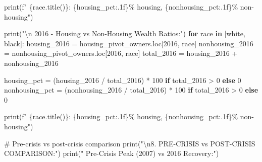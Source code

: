 \documentclass[
  letterpaper,
  DIV=11,
  numbers=noendperiod]{scrartcl}
\newenvironment{Shaded}{\begin{snugshade}}{\end{snugshade}}
\newcommand{\BuiltInTok}[1]{\textcolor[rgb]{0.00,0.23,0.31}{#1}}
\newcommand{\CharTok}[1]{\textcolor[rgb]{0.13,0.47,0.30}{#1}}
\newcommand{\CommentTok}[1]{\textcolor[rgb]{0.37,0.37,0.37}{#1}}
\newcommand{\ControlFlowTok}[1]{\textcolor[rgb]{0.00,0.23,0.31}{\textbf{#1}}}
\newcommand{\DecValTok}[1]{\textcolor[rgb]{0.68,0.00,0.00}{#1}}
\newcommand{\KeywordTok}[1]{\textcolor[rgb]{0.00,0.23,0.31}{\textbf{#1}}}
\newcommand{\NormalTok}[1]{\textcolor[rgb]{0.00,0.23,0.31}{#1}}
\newcommand{\OperatorTok}[1]{\textcolor[rgb]{0.37,0.37,0.37}{#1}}
\newcommand{\SpecialCharTok}[1]{\textcolor[rgb]{0.37,0.37,0.37}{#1}}
\newcommand{\SpecialStringTok}[1]{\textcolor[rgb]{0.13,0.47,0.30}{#1}}
\newcommand{\StringTok}[1]{\textcolor[rgb]{0.13,0.47,0.30}{#1}}
\begin{document}
\begin{Shaded}
\begin{Highlighting}[]
    \BuiltInTok{print}\NormalTok{(}\SpecialStringTok{f"     }\SpecialCharTok{\{}\NormalTok{race}\SpecialCharTok{.}\NormalTok{title()}\SpecialCharTok{\}}\SpecialStringTok{: }\SpecialCharTok{\{}\NormalTok{housing\_pct}\SpecialCharTok{:.1f\}}\SpecialStringTok{\% housing, }\SpecialCharTok{\{}\NormalTok{nonhousing\_pct}\SpecialCharTok{:.1f\}}\SpecialStringTok{\% non{-}housing"}\NormalTok{)}

\BuiltInTok{print}\NormalTok{(}\StringTok{"}\CharTok{\textbackslash{}n}\StringTok{   2016 {-} Housing vs Non{-}Housing Wealth Ratios:"}\NormalTok{)}
\ControlFlowTok{for}\NormalTok{ race }\KeywordTok{in}\NormalTok{ [}\StringTok{\textquotesingle{}white\textquotesingle{}}\NormalTok{, }\StringTok{\textquotesingle{}black\textquotesingle{}}\NormalTok{]:}
\NormalTok{    housing\_2016 }\OperatorTok{=}\NormalTok{ housing\_pivot\_owners.loc[}\DecValTok{2016}\NormalTok{, race]}
\NormalTok{    nonhousing\_2016 }\OperatorTok{=}\NormalTok{ nonhousing\_pivot\_owners.loc[}\DecValTok{2016}\NormalTok{, race]}
\NormalTok{    total\_2016 }\OperatorTok{=}\NormalTok{ housing\_2016 }\OperatorTok{+}\NormalTok{ nonhousing\_2016}
    
\NormalTok{    housing\_pct }\OperatorTok{=}\NormalTok{ (housing\_2016 }\OperatorTok{/}\NormalTok{ total\_2016) }\OperatorTok{*} \DecValTok{100} \ControlFlowTok{if}\NormalTok{ total\_2016 }\OperatorTok{\textgreater{}} \DecValTok{0} \ControlFlowTok{else} \DecValTok{0}
\NormalTok{    nonhousing\_pct }\OperatorTok{=}\NormalTok{ (nonhousing\_2016 }\OperatorTok{/}\NormalTok{ total\_2016) }\OperatorTok{*} \DecValTok{100} \ControlFlowTok{if}\NormalTok{ total\_2016 }\OperatorTok{\textgreater{}} \DecValTok{0} \ControlFlowTok{else} \DecValTok{0}
    
    \BuiltInTok{print}\NormalTok{(}\SpecialStringTok{f"     }\SpecialCharTok{\{}\NormalTok{race}\SpecialCharTok{.}\NormalTok{title()}\SpecialCharTok{\}}\SpecialStringTok{: }\SpecialCharTok{\{}\NormalTok{housing\_pct}\SpecialCharTok{:.1f\}}\SpecialStringTok{\% housing, }\SpecialCharTok{\{}\NormalTok{nonhousing\_pct}\SpecialCharTok{:.1f\}}\SpecialStringTok{\% non{-}housing"}\NormalTok{)}

\CommentTok{\# Pre{-}crisis vs post{-}crisis comparison}
\BuiltInTok{print}\NormalTok{(}\StringTok{"}\CharTok{\textbackslash{}n}\StringTok{8. PRE{-}CRISIS vs POST{-}CRISIS COMPARISON:"}\NormalTok{)}
\BuiltInTok{print}\NormalTok{(}\StringTok{"   Pre{-}Crisis Peak (2007) vs 2016 Recovery:"}\NormalTok{)}


\end{Highlighting}
\end{Shaded}
\end{document}
